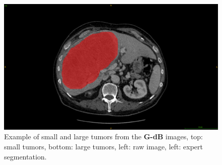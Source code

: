 \documentclass[]{article}
\newcommand{\lmttfont}[1]{{\fontfamily{lmtt}\selectfont #1}}
\begin{document}
\begin{figure}[!ht]
\begin{minipage}{0.45\linewidth}
	\end{minipage} \hspace{-0.1cm}
	\begin{minipage}{0.45\linewidth}
		\includegraphics[width=\linewidth]{../Contributions/images/ResizeGDB_examplePatientLargeTumor_seg}
	\end{minipage}
	\caption{Example of small and large tumors from the \textbf{\lmttfont{G-dB}} images, top: small tumors, bottom: large tumors, left: raw image, left: expert segmentation.}
	\label{fig:interdb_tumorSeg_tumorExamples}
\end{figure}
\end{document}
